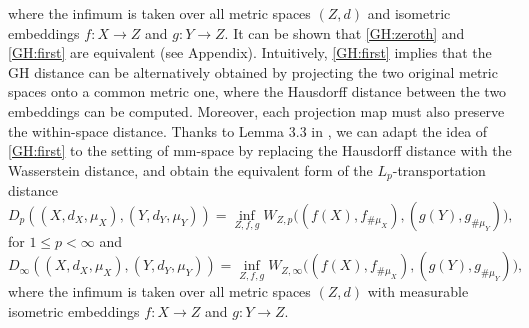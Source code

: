 where the infimum is taken over all metric spaces $(Z,d)$ and isometric embeddings
$f: X \to Z$ and $g: Y \to Z$. It can be shown that \eqref{GH:zeroth} and \eqref{GH:first}
are equivalent (see Appendix). Intuitively, \eqref{GH:first} implies that
the GH distance can be alternatively obtained by projecting the two original metric spaces
onto a common metric one, where the Hausdorff distance between the two embeddings can be computed.
Moreover, each projection map must also preserve the within-space distance.
Thanks to Lemma 3.3 in \citep{Sturm06}, we can adapt the idea of \eqref{GH:first}
to the setting of mm-space by replacing the Hausdorff distance with the Wasserstein distance,
and obtain the equivalent form of the $L_p$-transportation distance
\begin{equation}
   \label{D:alter}
  D_p((X, d_X, \mu_X), (Y, d_Y, \mu_Y)) =
  \inf_{Z, f, g} W_{Z, p} \big( (f(X), f_{\# \mu_X}), (g(Y), g_{\# \mu_Y}) \big),
\end{equation}
for $1 \leq p < \infty$ and
\begin{equation}
   \label{D:alter_infty}
  D_{\infty}((X, d_X, \mu_X), (Y, d_Y, \mu_Y)) =
  \inf_{Z, f, g} W_{Z, \infty}\big( (f(X), f_{\# \mu_X} ), (g(Y), g_{\# \mu_Y} ) \big),
\end{equation}
where the infimum is taken over all metric spaces $(Z,d)$ with measurable isometric embeddings
$f: X \to Z$ and $g: Y \to Z$.

